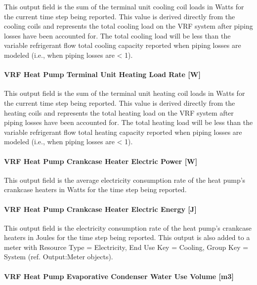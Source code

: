 This output field is the sum of the terminal unit cooling coil loads in Watts for the current time step being reported. This value is derived directly from the cooling coils and represents the total cooling load on the VRF system after piping losses have been accounted for. The total cooling load will be less than the variable refrigerant flow total cooling capacity reported when piping losses are modeled (i.e., when piping losses are \textless{} 1).

\paragraph{VRF Heat Pump Terminal Unit Heating Load Rate {[}W{]}}\label{vrf-heat-pump-terminal-unit-heating-load-rate-w}

This output field is the sum of the terminal unit heating coil loads in Watts for the current time step being reported. This value is derived directly from the heating coils and represents the total heating load on the VRF system after piping losses have been accounted for. The total heating load will be less than the variable refrigerant flow total heating capacity reported when piping losses are modeled (i.e., when piping losses are \textless{} 1).

\paragraph{VRF Heat Pump Crankcase Heater Electric Power {[}W{]}}\label{vrf-heat-pump-crankcase-heater-electric-power-w}

This output field is the average electricity consumption rate of the heat pump's crankcase heaters in Watts for the time step being reported.

\paragraph{VRF Heat Pump Crankcase Heater Electric Energy {[}J{]}}\label{vrf-heat-pump-crankcase-heater-electric-energy-j}

This output field is the electricity consumption rate of the heat pump's crankcase heaters in Joules for the time step being reported. This output is also added to a meter with Resource Type = Electricity, End Use Key = Cooling, Group Key = System (ref. Output:Meter objects).

\paragraph{VRF Heat Pump Evaporative Condenser Water Use Volume {[}m3{]}}\label{vrf-heat-pump-evaporative-condenser-water-use-volume-m3}

